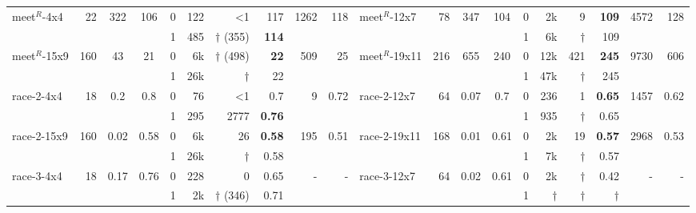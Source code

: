 \begin{table*}[t]
{\begin{tabular}{
l r@{\hskip 12pt}cc@{\hskip 12pt}cr@{\hskip 12pt}rr@{\hskip 12pt} rr@{\hskip 24pt}
l r@{\hskip 12pt}cc@{\hskip 12pt}cr@{\hskip 12pt}rr@{\hskip 12pt} rr
}
\midrule
\multirow{2}{*}{meet$^R\!$-4x4} & \multirow{2}{*}{22} & \multirow{2}{*}{322} &\multirow{2}{*}{106} & 0 & 122 & <1 & 117 & \multirow{2}{*}{1262} & \multirow{2}{*}{118} &
\multirow{2}{*}{meet$^R\!$-12x7} & \multirow{2}{*}{78} & \multirow{2}{*}{347} & \multirow{2}{*}{104} & 0 & 2k & 9 & \textbf{109} & \multirow{2}{*}{4572} & \multirow{2}{*}{128} \\
& & & & 1 & 485 & $\dagger$ (355) & \textbf{114} &
& & & & & & 1 & 6k & $\dagger$ & 109  \\

\midrule
\multirow{2}{*}{meet$^R\!$-15x9} & \multirow{2}{*}{160} & \multirow{2}{*}{43} & \multirow{2}{*}{21} & 0 & 6k & $\dagger$ (498) & \textbf{22} & \multirow{2}{*}{509} & \multirow{2}{*}{25} &
\multirow{2}{*}{meet$^R\!$-19x11} & \multirow{2}{*}{216} & \multirow{2}{*}{655} & \multirow{2}{*}{240} & 0 & 12k & 421 & \textbf{245}  & \multirow{2}{*}{9730} & \multirow{2}{*}{606} \\
& & & & 1 & 26k & $\dagger$ & 22 &
& & & & & & 1 & 47k & $\dagger$ & 245  \\

\midrule
\multirow{2}{*}{race-2-4x4} & \multirow{2}{*}{18} & \multirow{2}{*}{0.2} & \multirow{2}{*}{0.8} & 0 & 76 & <1 & 0.7 & \multirow{2}{*}{9} & \multirow{2}{*}{0.72} &
\multirow{2}{*}{race-2-12x7} & \multirow{2}{*}{64} & \multirow{2}{*}{0.07} & \multirow{2}{*}{0.7} & 0 & 236 & 1 & \textbf{0.65}  & \multirow{2}{*}{1457} & \multirow{2}{*}{0.62}  \\
& & & & 1 & 295 & 2777 & \textbf{0.76} &
& & & & & & 1 & 935 & $\dagger$ & 0.65  \\

\midrule
\multirow{2}{*}{race-2-15x9} & \multirow{2}{*}{160} & \multirow{2}{*}{0.02} & \multirow{2}{*}{0.58} & 0 & 6k & 26 & \textbf{0.58} & \multirow{2}{*}{195} & \multirow{2}{*}{0.51} &
\multirow{2}{*}{race-2-19x11} & \multirow{2}{*}{168} & \multirow{2}{*}{0.01} & \multirow{2}{*}{0.61} & 0 & 2k & 19 & \textbf{0.57}  & \multirow{2}{*}{2968} & \multirow{2}{*}{0.53}  \\
& & & & 1 & 26k & $\dagger$ & 0.58 &
& & & & & & 1 & 7k & $\dagger$ & 0.57  \\

\midrule
\multirow{2}{*}{race-3-4x4} & \multirow{2}{*}{18} & \multirow{2}{*}{0.17} & \multirow{2}{*}{0.76} & 0 & 228 & 0 & 0.65 & \multirow{2}{*}{-} & \multirow{2}{*}{-} &
\multirow{2}{*}{race-3-12x7} & \multirow{2}{*}{64} & \multirow{2}{*}{0.02} & \multirow{2}{*}{0.61} & 0 & 2k & $\dagger$ & 0.42  & \multirow{2}{*}{-} & \multirow{2}{*}{-} \\
& & & & 1 & 2k & $\dagger$ (346) & 0.71 &
& & & & & & 1 & $\dagger$ & $\dagger$  & $\dagger$ \\


\end{tabular}}
\end{table*}
